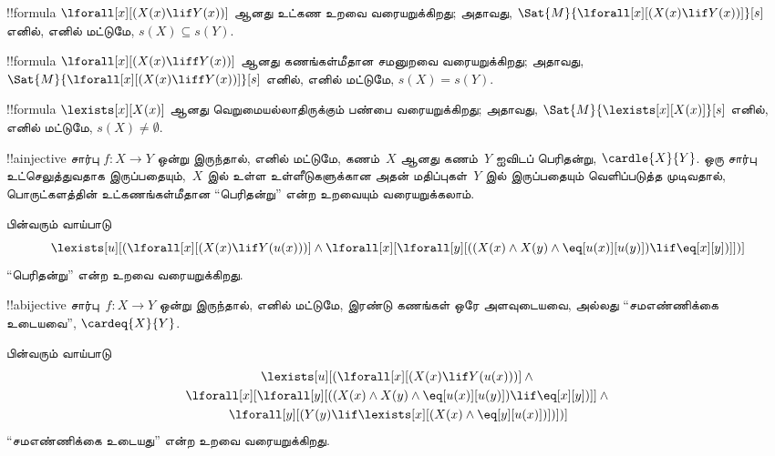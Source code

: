 \documentclass[../../../include/open-logic-section]{subfiles}
\begin{document}



\begin{prop}
!!{formula} $\lforall[x][(X(x) \lif Y(x))]$ ஆனது உட்கண உறவை
வரையறுக்கிறது; அதாவது,
$\Sat{M}{\lforall[x][(X(x) \lif Y(x))]}[s]$ எனில், எனில் மட்டுமே,
$s(X) \subseteq s(Y)$.
\end{prop}

\begin{prop}
!!{formula} $\lforall[x][(X(x) \liff Y(x))]$ ஆனது கணங்கள்மீதான
சமனுறவை வரையறுக்கிறது; அதாவது,
$\Sat{M}{\lforall[x][(X(x) \liff Y(x))]}[s]$ எனில், எனில் மட்டுமே,
$s(X) = s(Y)$.
\end{prop}

\begin{prop}
!!{formula} $\lexists[x][X(x)]$ ஆனது வெறுமையல்லாதிருக்கும்
பண்பை வரையறுக்கிறது; அதாவது,
$\Sat{M}{\lexists[x][X(x)]}[s]$ எனில், எனில் மட்டுமே,
$s(X) \neq \emptyset$.
\end{prop}

!!a{injective} சார்பு $f\colon X \to Y$ ஒன்று இருந்தால், எனில்
மட்டுமே, கணம்~$X$ ஆனது கணம்~$Y$ ஐவிடப் பெரிதன்று,
$\cardle{X}{Y}$. ஒரு சார்பு உட்செலுத்துவதாக இருப்பதையும்,~$X$ இல்
உள்ள உள்ளீடுகளுக்கான அதன் மதிப்புகள்~$Y$ இல் இருப்பதையும்
வெளிப்படுத்த முடிவதால், பொருட்களத்தின் உட்கணங்கள்மீதான “பெரிதன்று”
என்ற உறவையும் வரையறுக்கலாம்.

\begin{prop}
பின்வரும் வாய்பாடு
\[
\lexists[u][(\lforall[x][(X(x) \lif Y(u(x)))] \land
  \lforall[x][\lforall[y][((X(x) \land X(y) \land
      \eq[u(x)][u(y)]) \lif \eq[x][y])]])]
\]
“பெரிதன்று” என்ற உறவை வரையறுக்கிறது.
\end{prop}

!!a{bijective} சார்பு~$f\colon X \to Y$ ஒன்று இருந்தால், எனில்
மட்டுமே, இரண்டு கணங்கள் ஒரே அளவுடையவை, அல்லது “சமஎண்ணிக்கை
உடையவை”, $\cardeq{X}{Y}$.

\begin{prop}
பின்வரும் வாய்பாடு
\begin{multline*}
  \lexists[u][(\lforall[x][(X(x) \lif Y(u(x)))] \land {}\\
    \lforall[x][\lforall[y][((X(x) \land X(y) \land
      \eq[u(x)][u(y)]) \lif \eq[x][y])]]
  \land {} \\\lforall[y][(Y(y) \lif \lexists[x][(X(x)
      \land \eq[y][u(x)])])])]
\end{multline*}
“சமஎண்ணிக்கை உடையது” என்ற உறவை வரையறுக்கிறது.
\end{prop}
\end{document}
